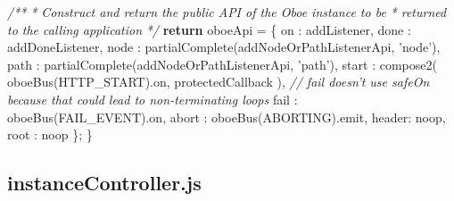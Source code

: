 \documentclass[12pt, ]{article}
\newenvironment{Shaded}{}{}
\newcommand{\KeywordTok}[1]{\textcolor[rgb]{0.00,0.44,0.13}{\textbf{{#1}}}}
\newcommand{\DataTypeTok}[1]{\textcolor[rgb]{0.56,0.13,0.00}{{#1}}}
\newcommand{\StringTok}[1]{\textcolor[rgb]{0.25,0.44,0.63}{{#1}}}
\newcommand{\CommentTok}[1]{\textcolor[rgb]{0.38,0.63,0.69}{\textit{{#1}}}}
\newcommand{\FunctionTok}[1]{\textcolor[rgb]{0.02,0.16,0.49}{{#1}}}
\newcommand{\NormalTok}[1]{{#1}}
\begin{document}
\begin{Shaded}
\begin{Highlighting}[]
   \CommentTok{/**}
\CommentTok{    * Construct and return the public API of the Oboe instance to be }
\CommentTok{    * returned to the calling application}
\CommentTok{    */}       
   \KeywordTok{return} \NormalTok{oboeApi = \{}
      \DataTypeTok{on    }\NormalTok{:  addListener,   }
      \DataTypeTok{done  }\NormalTok{:  addDoneListener,       }
      \DataTypeTok{node  }\NormalTok{:  }\FunctionTok{partialComplete}\NormalTok{(addNodeOrPathListenerApi, }\StringTok{'node'}\NormalTok{),}
      \DataTypeTok{path  }\NormalTok{:  }\FunctionTok{partialComplete}\NormalTok{(addNodeOrPathListenerApi, }\StringTok{'path'}\NormalTok{),      }
      \DataTypeTok{start }\NormalTok{:  }\FunctionTok{compose2}\NormalTok{( }\FunctionTok{oboeBus}\NormalTok{(HTTP_START).}\FunctionTok{on}\NormalTok{, protectedCallback ),}
      \CommentTok{// fail doesn't use safeOn because that could lead to non-terminating loops}
      \DataTypeTok{fail  }\NormalTok{:  }\FunctionTok{oboeBus}\NormalTok{(FAIL_EVENT).}\FunctionTok{on}\NormalTok{,}
      \DataTypeTok{abort }\NormalTok{:  }\FunctionTok{oboeBus}\NormalTok{(ABORTING).}\FunctionTok{emit}\NormalTok{,}
      \DataTypeTok{header}\NormalTok{:  noop,}
      \DataTypeTok{root  }\NormalTok{:  noop}
   \NormalTok{\};   }
\NormalTok{\}   }
   
\end{Highlighting}
\end{Shaded}

\pagebreak

\subsection{instanceController.js}\label{headerux5finstanceController}

\label{src_instanceController}
\end{document}

